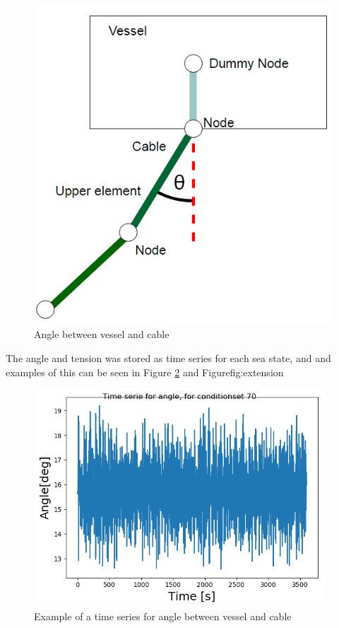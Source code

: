 \begin{figure}[H]
\centering
\includegraphics[scale=0.65]{figures/angle}
\caption[Angle between vessel and cable ]{Angle between vessel and cable  }
 \label{fig:angle}
\end{figure}

\noindent The angle and tension was stored as time series for each sea state, and and examples of this can be seen in Figure \ref{fig:angleex} and Figure{fig:extension}

\begin{figure}[H]
\centering
\includegraphics[scale=0.8]{figures/angleex}
\caption[Example of a time series for angle between vessel and cable  ]{Example of a time series for angle between vessel and cable}
 \label{fig:angleex}
\end{figure}

